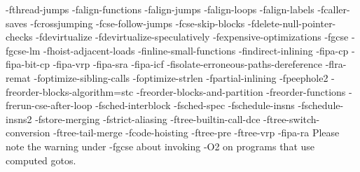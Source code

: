 -fthread-jumps 
-falign-functions  -falign-jumps 
-falign-loops  -falign-labels 
-fcaller-saves 
-fcrossjumping 
-fcse-follow-jumps  -fcse-skip-blocks 
-fdelete-null-pointer-checks 
-fdevirtualize -fdevirtualize-speculatively 
-fexpensive-optimizations 
-fgcse  -fgcse-lm  
-fhoist-adjacent-loads 
-finline-small-functions 
-findirect-inlining 
-fipa-cp 
-fipa-bit-cp 
-fipa-vrp 
-fipa-sra 
-fipa-icf 
-fisolate-erroneous-paths-dereference 
-flra-remat 
-foptimize-sibling-calls 
-foptimize-strlen 
-fpartial-inlining 
-fpeephole2 
-freorder-blocks-algorithm=stc 
-freorder-blocks-and-partition -freorder-functions 
-frerun-cse-after-loop  
-fsched-interblock  -fsched-spec 
-fschedule-insns  -fschedule-insns2 
-fstore-merging 
-fstrict-aliasing 
-ftree-builtin-call-dce 
-ftree-switch-conversion -ftree-tail-merge 
-fcode-hoisting 
-ftree-pre 
-ftree-vrp 
-fipa-ra
Please note the warning under -fgcse about invoking -O2 on programs that use computed gotos.



